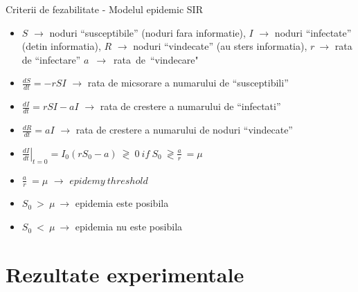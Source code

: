 \documentclass{beamer}
\begin{document}
\begin{frame}{Criterii de fezabilitate - Modelul epidemic SIR}
	\begin{itemize}
	  \item $S$ $\rightarrow$ noduri ``susceptibile'' (noduri fara informatie), $I$
	  $\rightarrow$ noduri ``infectate'' (detin informatia), $R$ $\rightarrow$ noduri
	  ``vindecate'' (au sters informatia), $r\ \rightarrow$ rata de ``infectare''
	  \mbox{$a$ $\rightarrow$ rata de ``vindecare"}
	  \item $\frac{dS}{dt} = -rSI$ $\rightarrow$ rata de micsorare a numarului de
	  ``susceptibili''
	  \item $\frac{dI}{dt} = rSI - aI$ $\rightarrow$ rata de crestere a numarului
	  de ``infectati''
	  \item $\frac{dR}{dt} = aI$ $\rightarrow$ rata de crestere a numarului de
	  noduri ``vindecate''
	  \item $\left.
\frac{dI}{dt}
\right|_{t=0} = I_{0} (rS_{0} - a)\ \gtrless\ 0\ if\ S_{0}\ \gtrless
\frac{a}{r}\ = \mu$
	\end{itemize}
	\hskip0.5in
	\small{
		\begin{beamerboxesrounded}[lower=block body,shadow=true,width=3.2in]{}
			\begin{itemize}
				\item{$\frac{a}{r}\ = \mu$ $\rightarrow$ $epidemy\ threshold$}
				\item{$S_{0}\ >\ \mu\ \rightarrow$ epidemia este posibila}
				\item{$S_{0}\ <\ \mu\ \rightarrow$ epidemia nu este posibila}
			\end{itemize}
		\end{beamerboxesrounded}
	}
\end{frame}

\section{Rezultate experimentale}
\end{document}
